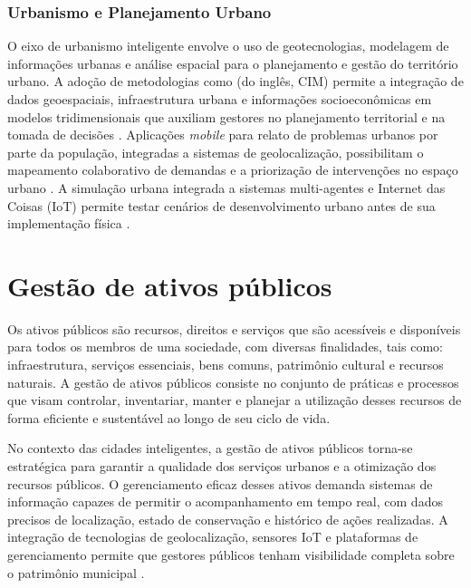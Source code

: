 \subsubsection{Urbanismo e Planejamento Urbano}

O eixo de urbanismo inteligente envolve o uso de geotecnologias, modelagem de informações 
urbanas e análise espacial para o planejamento e gestão do território urbano. A adoção de 
metodologias como (do inglês, \gls{CIM}) permite a integração de dados 
geoespaciais, infraestrutura urbana e informações socioeconômicas em modelos tridimensionais 
que auxiliam gestores no planejamento territorial e na tomada de decisões \cite{SANTIAGO2023}. 
Aplicações \textit{mobile} para relato de problemas urbanos por parte da população, integradas a sistemas 
de geolocalização, possibilitam o mapeamento colaborativo de demandas e a priorização de 
intervenções no espaço urbano \cite{SANTOS2019}. A simulação urbana integrada a sistemas 
multi-agentes e Internet das Coisas (\gls{IoT}) permite testar cenários de desenvolvimento urbano 
antes de sua implementação física \cite{CASTRO2020}. 


\section{Gestão de ativos públicos}

Os ativos públicos são recursos, direitos e serviços que são acessíveis e disponíveis para 
todos os membros de uma sociedade, com diversas finalidades, tais como: infraestrutura, serviços 
essenciais, bens comuns, patrimônio cultural e recursos naturais. A gestão de ativos públicos 
consiste no conjunto de práticas e processos que visam controlar, inventariar, manter e planejar 
a utilização desses recursos de forma eficiente e sustentável ao longo de seu ciclo de vida.


No contexto das cidades inteligentes, a gestão de ativos públicos torna-se estratégica para 
garantir a qualidade dos serviços urbanos e a otimização dos recursos públicos. O gerenciamento 
eficaz desses ativos demanda sistemas de informação capazes de permitir o acompanhamento em 
tempo real, com dados precisos de localização, estado de conservação e histórico de ações 
realizadas. A integração de tecnologias de geolocalização, sensores \gls{IoT} e plataformas de 
gerenciamento permite que gestores públicos tenham visibilidade completa sobre o patrimônio 
municipal \cite{SANTIAGO2023}.

